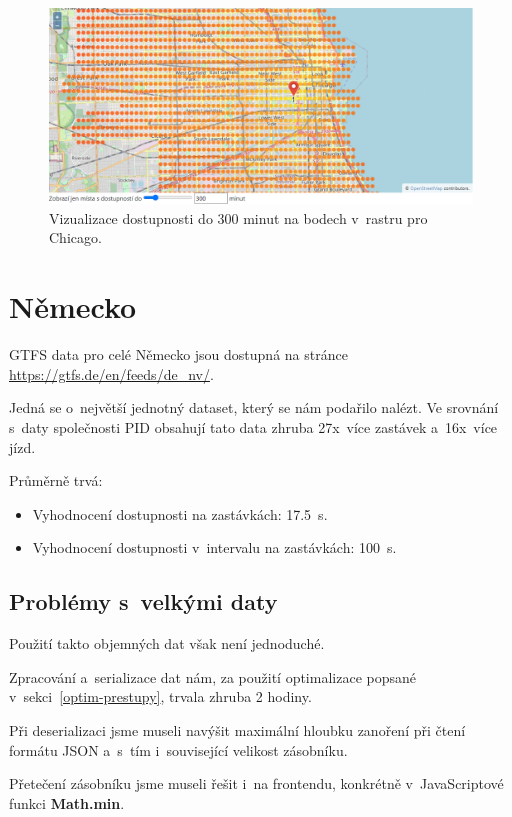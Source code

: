 \begin{figure}[ht]
    \centering
    \includegraphics[width=\textwidth]{../img/Chicago-body.png}
    \caption{Vizualizace dostupnosti do 300 minut na bodech v~rastru pro Chicago.}
    \label{fig:Chicago-body}
\end{figure}


\section{Německo}

GTFS data pro celé Německo jsou dostupná na stránce \url{https://gtfs.de/en/feeds/de\_nv/}.

Jedná se o~největší jednotný dataset, který se nám podařilo nalézt. Ve srovnání s~daty společnosti PID obsahují tato data zhruba 27x~více zastávek a~16x~více jízd.

Průměrně trvá:
\begin{itemize}
    \item Vyhodnocení dostupnosti na zastávkách: 17.5~s.
    
    \item Vyhodnocení dostupnosti v~intervalu na zastávkách: 100~s.
\end{itemize}

\subsection{Problémy s~velkými daty}

Použití takto objemných dat však není jednoduché.

Zpracování a~serializace dat nám, za použití optimalizace popsané v~sekci~\ref{optim-prestupy}, trvala zhruba 2 hodiny.

Při deserializaci jsme museli navýšit maximální hloubku zanoření při čtení formátu JSON a~s~tím i~související velikost zásobníku.

Přetečení zásobníku jsme museli řešit i~na frontendu, konkrétně v~JavaScriptové funkci \textbf{Math.min}. 

